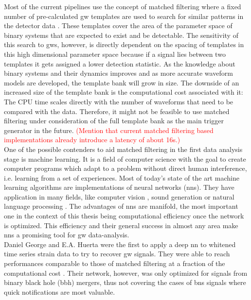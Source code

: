 Most of the current pipelines use the concept of matched filtering where a fixed number of pre-calculated \gls{gw} templates are used to search for similar patterns in the detector data \cite{ligo_pipelines}. These templates cover the area of the parameter space of binary systems that are expected to exist and be detectable. The sensitivity of this search to \gls{gw}s, however, is directly dependent on the spacing of templates in this high dimensional parameter space because if a signal lies between two templates it gets assigned a lower detection statistic. As the knowledge about binary systems and their dynamics improves and as more accurate waveform models are developed, the template bank will grow in size. The downside of an increased size of the template bank is the computational cost associated with it: The CPU time scales directly with the number of waveforms that need to be compared with the data. Therefore, it might not be feasible to use matched filtering under consideration of the full template bank as the main trigger generator in the future. \textcolor{red}{(Mention that current matched filtering based implementations already introduce a latency of about 16s.)}\\
One of the possible contenders to aid matched filtering in the first data analysis stage is machine learning. It is a field of computer science with the goal to create computer programs which adapt to a problem without direct human interference, i.e. learning from a set of experiences. Most of today's state of the art machine learning algorithms are implementations of neural networks (\gls{nn}s). They have application in many fields, like computer vision \cite{ILSVRC15}, sound generation \cite{wavenet} or natural language processing \cite{natural_language_processing}. The advantages of \gls{nns} are manifold, the most important one in the context of this thesis being computational efficiency once the network is optimized. This efficiency and their general success in almost any area make \gls{nn}s a promising tool for \gls{gw} data-analysis.\\
Daniel George and E.A. Huerta were the first to apply a deep \gls{nn} to whitened time series strain data to try to recover \gls{gw} signals. They were able to reach performances comparable to those of matched filtering at a fraction of the computational cost \cite{original_deep_filtering}. Their network, however, was only optimized for signals from binary black hole (\gls{bbh}) mergers, thus not covering the cases of \gls{bns} signals where quick notifications are most valuable.\\
